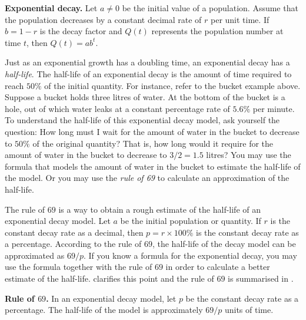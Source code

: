 \documentclass[a4paper,oneside,12pt]{article}
\begin{document}
\begin{theorem}
\label{thm:exponential:exponential_decay}
\textbf{Exponential decay.}
Let $a \neq 0$ be the initial value of a population.  Assume that the
population decreases by a constant decimal rate of $r$ per unit time.
If $b = 1 - r$ is the decay factor and $Q(t)$ represents the
population number at time $t$, then $Q(t) = ab^t$.
\end{theorem}

Just as an exponential growth has a doubling time, an exponential
decay has a \emph{half-life}.  The half-life of an exponential decay
is the amount of time required to reach $50\%$ of the initial
quantity.  For instance, refer to the bucket example above.  Suppose a
bucket holds three litres of water.  At the bottom of the bucket is a
hole, out of which water leaks at a constant percentage rate of
$5.6\%$ per minute.  To understand the half-life of this exponential
decay model, ask yourself the question:  How long must I wait for the
amount of water in the bucket to decrease to $50\%$ of the original
quantity?  That is, how long would it require for the amount of water
in the bucket to decrease to $3 / 2 = 1.5$ litres?  You may use the
formula that models the amount of water in the bucket to estimate the
half-life of the model.  Or you may use the \emph{rule of 69} to
calculate an approximation of the half-life.

The rule of $69$ is a way to obtain a rough estimate of the half-life
of an exponential decay model.  Let $a$ be the initial population or
quantity.  If $r$ is the constant decay rate as a decimal, then
$p = r \times 100\%$ is the constant decay rate as a percentage.
According to the rule of $69$, the half-life of the decay model can be
approximated as $69 / p$.  If you know a formula for the exponential
decay, you may use the formula together with the rule of $69$ in order
to calculate a better estimate of the half-life.
 clarifies this point and the rule
of $69$ is summarised in .

\begin{theorem}
\label{thm:exponential:rule_of_69}
\textbf{Rule of $69$.}
In an exponential decay model, let $p$ be the constant decay rate as a
percentage.  The half-life of the model is approximately $69 / p$
units of time.
\end{theorem}
\end{document}
